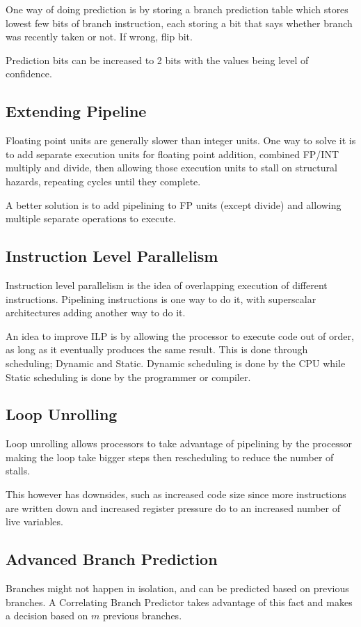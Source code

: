 \documentclass{article}
\theoremstyle{remark}
\begin{document}
One way of doing prediction is by storing a branch prediction table which stores lowest few bits of branch instruction, each storing a bit that says whether branch was recently taken or not. If wrong, flip bit.

Prediction bits can be increased to 2 bits with the values being level of confidence.

\subsection{Extending Pipeline}
Floating point units are generally slower than integer units. One way to solve it is to add separate execution units for floating point addition, combined FP/INT multiply and divide, then allowing those execution units to stall on structural hazards, repeating cycles until they complete.

A better solution is to add pipelining to FP units (except divide) and allowing multiple separate operations to execute.

\subsection{Instruction Level Parallelism}
Instruction level parallelism is the idea of overlapping execution of different instructions. Pipelining instructions is one way to do it, with superscalar architectures adding another way to do it.

An idea to improve ILP is by allowing the processor to execute code out of order, as long as it eventually produces the same result. This is done through scheduling; Dynamic and Static. Dynamic scheduling is done by the CPU while Static scheduling is done by the programmer or compiler.

\subsection{Loop Unrolling}
Loop unrolling allows processors to take advantage of pipelining by the processor making the loop take bigger steps then rescheduling to reduce the number of stalls.

This however has downsides, such as increased code size since more instructions are written down and increased register pressure do to an increased number of live variables.

\subsection{Advanced Branch Prediction}
Branches might not happen in isolation, and can be predicted based on previous branches. A Correlating Branch Predictor takes advantage of this fact and makes a decision based on \(m\) previous branches.
\end{document}
